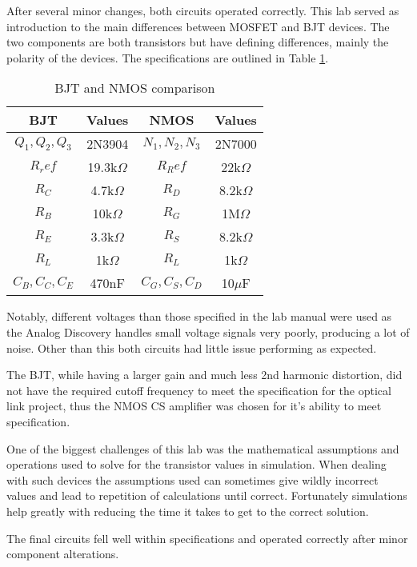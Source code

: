 
After several minor changes, both circuits operated correctly. This lab served as introduction to the main differences between MOSFET and BJT devices. The two components are both transistors but have defining differences, mainly the polarity of the devices. The specifications are outlined in Table \ref{tab:specs}.

\begin{table}[H]
	\centering
	\caption{BJT and NMOS comparison}
	\label{tab:specs}
	\begin{tabular}{|c|c|c|c|}
		\hline
		BJT             & Values        & NMOS            & Values       \\ \hline
		$Q_1, Q_2, Q_3$ & 2N3904        & $N_1, N_2, N_3$ & 2N7000       \\ \hline
		$R_ref$         & 19.3k$\Omega$ & $R_Ref$         & 22k$\Omega$  \\ \hline
		$R_C$           & 4.7k$\Omega$  & $R_D$           & 8.2k$\Omega$ \\ \hline
		$R_B$           & 10k$\Omega$   & $R_G$           & 1M$\Omega$   \\ \hline
		$R_E$           & 3.3k$\Omega$  & $R_S$           & 8.2k$\Omega$ \\ \hline
		$R_L$           & 1k$\Omega$    & $R_L$           & 1k$\Omega$   \\ \hline
		$C_B, C_C, C_E$ & 470nF         & $C_G, C_S, C_D$ & 10$\mu$F     \\ \hline
	\end{tabular}
\end{table}


Notably, different voltages than those specified in the lab manual were used as the Analog Discovery handles small voltage signals very poorly, producing a lot of noise.  Other than this both circuits had little issue performing as expected.

The BJT, while having a larger gain and much less 2nd harmonic distortion, did not have the required cutoff frequency to meet the specification for the optical link project, thus the NMOS CS amplifier was chosen for it's ability to meet specification.

One of the biggest challenges of this lab was the mathematical assumptions and operations used to solve for the transistor values in simulation. When dealing with such devices the assumptions used can sometimes give wildly incorrect values and lead to repetition of calculations until correct. Fortunately simulations help greatly with reducing the time it takes to get to the correct solution.

The final circuits fell well within specifications and operated correctly after minor component alterations.



